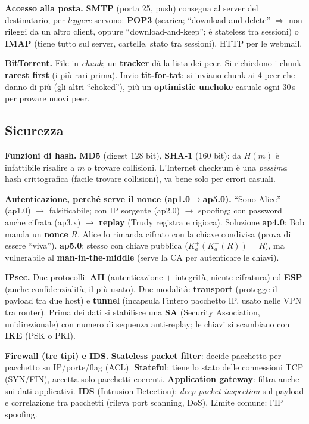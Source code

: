 \documentclass[11pt,a4paper]{report}
\begin{document}
\textbf{Accesso alla posta.} \textbf{SMTP} (porta 25, push) consegna al server
del destinatario; per \emph{leggere} servono: \textbf{POP3} (scarica;
``download-and-delete'' $\Rightarrow$ non rileggi da un altro client, oppure
``download-and-keep''; è stateless tra sessioni) o \textbf{IMAP} (tiene tutto sul
server, cartelle, stato tra sessioni). HTTP per le webmail.

\textbf{BitTorrent.} File in \emph{chunk}; un \textbf{tracker} dà la lista dei
peer. Si richiedono i chunk \textbf{rarest first} (i più rari prima). Invio
\textbf{tit-for-tat}: si inviano chunk ai 4 peer che danno di più (gli altri
``choked''), più un \textbf{optimistic unchoke} casuale ogni 30\,s per provare
nuovi peer.

\subsection*{Sicurezza}
\textbf{Funzioni di hash.} \textbf{MD5} (digest $128$ bit), \textbf{SHA-1}
($160$ bit): da $H(m)$ è infattibile risalire a $m$ o trovare collisioni.
L'Internet checksum è una \emph{pessima} hash crittografica (facile trovare
collisioni), va bene solo per errori casuali.

\textbf{Autenticazione, perché serve il nonce (ap1.0$\to$ap5.0).} ``Sono Alice''
(ap1.0) $\to$ falsificabile; con IP sorgente (ap2.0) $\to$ spoofing; con password
anche cifrata (ap3.x) $\to$ \textbf{replay} (Trudy registra e rigioca). Soluzione
\textbf{ap4.0}: Bob manda un \textbf{nonce} $R$, Alice lo rimanda cifrato con la
chiave condivisa (prova di essere ``viva''). \textbf{ap5.0}: stesso con chiave
pubblica ($K_a^+(K_a^-(R))=R$), ma vulnerabile al \textbf{man-in-the-middle}
(serve la CA per autenticare le chiavi).

\textbf{IPsec.} Due protocolli: \textbf{AH} (autenticazione $+$ integrità, niente
cifratura) ed \textbf{ESP} (anche confidenzialità; il più usato). Due modalità:
\textbf{transport} (protegge il payload tra due host) e \textbf{tunnel} (incapsula
l'intero pacchetto IP, usato nelle VPN tra router). Prima dei dati si stabilisce
una \textbf{SA} (Security Association, unidirezionale) con numero di sequenza
anti-replay; le chiavi si scambiano con \textbf{IKE} (PSK o PKI).

\textbf{Firewall (tre tipi) e IDS.} \textbf{Stateless packet filter}: decide
pacchetto per pacchetto su IP/porte/flag (ACL). \textbf{Stateful}: tiene lo stato
delle connessioni TCP (SYN/FIN), accetta solo pacchetti coerenti. \textbf{Application
gateway}: filtra anche sui dati applicativi. \textbf{IDS} (Intrusion Detection):
\emph{deep packet inspection} sul payload e correlazione tra pacchetti (rileva
port scanning, DoS). Limite comune: l'IP spoofing.
\end{document}
